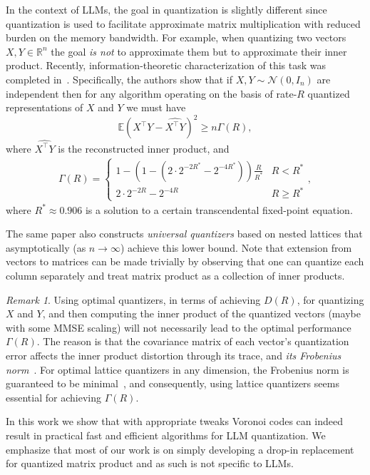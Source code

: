 \documentclass{article}
\newcommand{\RR}{\mathbb{R}}
\def\EE{\mathbb{E}}
\newcommand{\m}{\mathcal}
\theoremstyle{plain}
\theoremstyle{definition}
\theoremstyle{remark}
\newtheorem{remark}[theorem]{Remark}
\begin{document}
In the context of LLMs, the goal in quantization is slightly different since quantization is used to facilitate approximate matrix multiplication with reduced burden on the memory bandwidth. For example, when quantizing two vectors  $X,Y\in\RR^n$ the goal \emph{is not} to approximate them but to approximate their inner product. Recently, information-theoretic characterization of this task was completed in~\citep{op2024}. Specifically, the authors show that if $X,Y\sim\m{N}(0,I_n)$ are independent then for any algorithm operating on the basis of rate-$R$ quantized representations of $X$ and $Y$ we must have 
\begin{equation}\label{eq:lbnd}
\EE(X^\top Y-\widehat{X^\top Y})^2\geq n\Gamma(R),    
\end{equation}
where $\widehat{X^\top Y}$ is the reconstructed inner product, and
\begin{align}
\Gamma(R)=    \begin{cases}
1-\left(1-(2\cdot2^{-2R^*}-2^{-4R^*})\right)\frac{R}{R^*}   & R<R^* \\
2\cdot 2^{-2R}-2^{-4R}    & R\geq R^*
\end{cases},
\label{eq:gammadef}
\end{align}
where $R^*\approx 0.906$ is a solution to a certain transcendental fixed-point equation.

The same paper also constructs \textit{universal quantizers} based on nested lattices that asymptotically (as $n\to \infty$) achieve this lower bound. Note that extension from vectors to matrices can be made trivially by observing that one can quantize each column separately and treat matrix product as a collection of inner products.

\begin{remark}
Using optimal quantizers, in terms of achieving $D(R)$, for quantizing $X$ and $Y$, and then computing the inner product of the quantized vectors (maybe with some MMSE scaling) will not necessarily lead to the optimal performance $\Gamma(R)$. The reason is that the covariance matrix of each vector's quantization error affects the inner product distortion through its trace, and \emph{its Frobenius norm}~\cite{op2024}. For optimal lattice quantizers in any dimension, the Frobenius norm is guaranteed to be minimal~\cite{zamir1996lattice}, and consequently, using lattice quantizers seems essential for achieving $\Gamma(R)$.
\end{remark}

In this work we show that with appropriate tweaks Voronoi codes can indeed result in practical fast and efficient algorithms for LLM quantization. We emphasize that most of our work is on simply developing a drop-in replacement for quantized matrix product and as such is not specific to LLMs.
\end{document}
